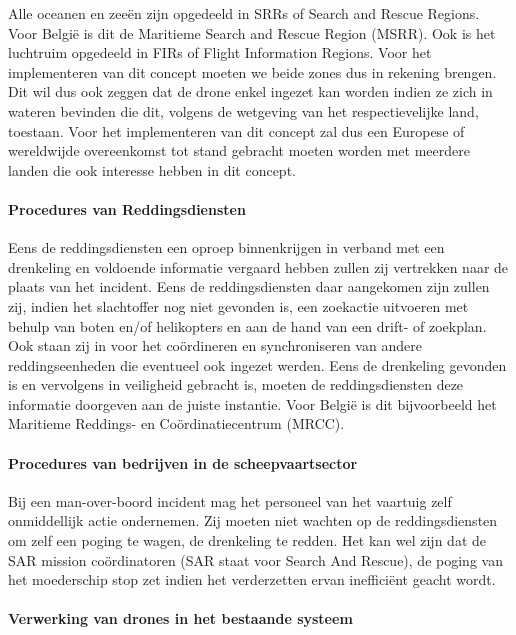 Alle oceanen en zeeën zijn opgedeeld in SRRs of Search and Rescue Regions. Voor België is dit de Maritieme Search and Rescue Region (MSRR). Ook is het luchtruim opgedeeld in FIRs of Flight Information Regions. Voor het implementeren van dit concept moeten we beide zones dus in rekening brengen. Dit wil dus ook zeggen dat de drone enkel ingezet kan worden indien ze zich in wateren bevinden die dit, volgens de wetgeving van het respectievelijke land, toestaan. Voor het implementeren van dit concept zal dus een Europese of wereldwijde overeenkomst tot stand gebracht moeten worden met meerdere landen die ook interesse hebben in dit concept.   

\paragraph{Procedures van Reddingsdiensten}

Eens de reddingsdiensten een oproep binnenkrijgen in verband met een drenkeling en voldoende informatie vergaard hebben zullen zij vertrekken naar de plaats van het incident. Eens de reddingsdiensten daar aangekomen zijn zullen zij, indien het slachtoffer nog niet gevonden is, een zoekactie uitvoeren met behulp van boten en/of helikopters en aan de hand van een drift- of zoekplan. Ook staan zij in voor het coördineren en synchroniseren van andere reddingseenheden die eventueel ook ingezet werden. Eens de drenkeling gevonden is en vervolgens in veiligheid gebracht is, moeten de reddingsdiensten deze informatie doorgeven aan de juiste instantie. Voor België is dit bijvoorbeeld het Maritieme Reddings- en Coördinatiecentrum (MRCC). 

\paragraph{Procedures van bedrijven in de scheepvaartsector}

Bij een man-over-boord incident mag het personeel van het vaartuig zelf onmiddellijk actie ondernemen. Zij moeten niet wachten op de reddingsdiensten om zelf een poging te wagen, de drenkeling te redden. Het kan wel zijn dat de SAR mission coördinatoren (SAR staat voor Search And Rescue), de poging van het moederschip stop zet indien het verderzetten ervan inefficiënt geacht wordt.

\paragraph{Verwerking van drones in het bestaande systeem}

